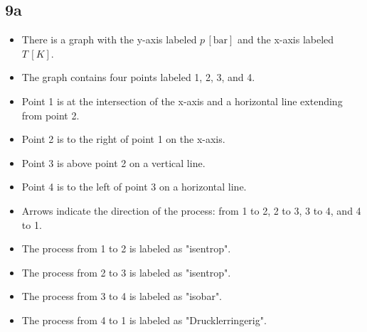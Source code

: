 \subsection*{9a}

\begin{itemize}
    \item There is a graph with the y-axis labeled \( p \, [\text{bar}] \) and the x-axis labeled \( T \, [K] \).
    \item The graph contains four points labeled 1, 2, 3, and 4.
    \item Point 1 is at the intersection of the x-axis and a horizontal line extending from point 2.
    \item Point 2 is to the right of point 1 on the x-axis.
    \item Point 3 is above point 2 on a vertical line.
    \item Point 4 is to the left of point 3 on a horizontal line.
    \item Arrows indicate the direction of the process: from 1 to 2, 2 to 3, 3 to 4, and 4 to 1.
    \item The process from 1 to 2 is labeled as "isentrop".
    \item The process from 2 to 3 is labeled as "isentrop".
    \item The process from 3 to 4 is labeled as "isobar".
    \item The process from 4 to 1 is labeled as "Drucklerringerig".
\end{itemize}